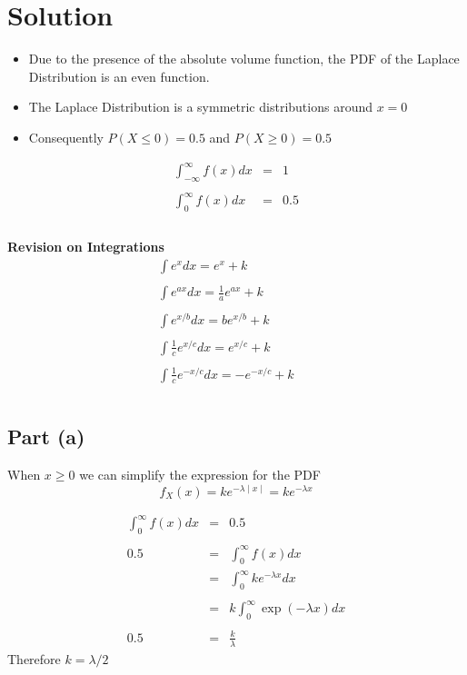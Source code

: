 \documentclass[a4paper,12pt]{article}
\begin{document}
	\section*{Solution}
	
	\begin{itemize}
		\item Due to the presence of the absolute volume function, the PDF of the Laplace Distribution is an even function.
		\item The Laplace Distribution is a symmetric distributions around $x=0$
		\item Consequently $P(X \leq 0 ) =0.5$ and $P(X\geq 0) = 0.5$
	\end{itemize}
	\newpage 
	\begin{eqnarray*}
		\int^{\infty}_{-\infty}f(x) dx &=& 1\\
		& & \\
		\int^{\infty}_{0}f(x) dx &=& 0.5\\
		& & \\
	\end{eqnarray*}
	
	\begin{framed}
		\noindent \textbf{Revision on Integrations}
		\begin{eqnarray*}
			\int e^{x} dx = e^{x} + k \\
			& & \\
			\int e^{ax} dx = \frac{1}{a}e^{ax} + k \\
			& & \\
			\int e^{x/b} dx = be^{x/b} + k \\
			& & \\
			\int \frac{1}{c}e^{x/c} dx = e^{x/c} + k \\
			& & \\
			\int \frac{1}{c}e^{-x/c} dx = -e^{-x/c} + k \\
			& & \\
		\end{eqnarray*}
	\end{framed}
	
	\newpage 
	\subsection*{Part (a)}
	\noindent When $x\geq 0$ we can simplify the expression for the PDF
	\[f_X(x)=k e^{-\lambda \mid x\mid} =k e^{-\lambda  x}\]
	
	
	\begin{eqnarray*}
		\int^{\infty}_{0}f(x) dx &=& 0.5\\
		& & \\
		0.5 &=& \int^{\infty}_{0}f(x) dx\\
		&=& \int^{\infty}_{0}k e^{ - \lambda  x} dx\\
		& & \\
		&=& k \int^{\infty}_{0} \operatorname{exp}( - \lambda  x) dx\\
		& & \\
		0.5 &=& \frac{k}{\lambda}
	\end{eqnarray*}
	\noindent Therefore ${\displaystyle k = \lambda/2}$
	\newpage 
\end{document}
